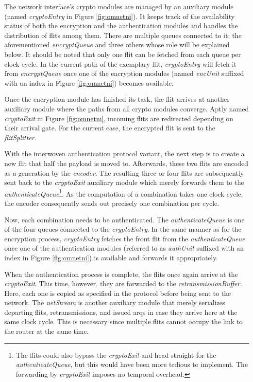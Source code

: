The network interface's crypto modules are managed by an auxiliary module (named \textit{cryptoEntry} in Figure \ref{fig:omnetni}). It keeps track of
the availability status of both the encryption and the authentication modules and handles the distribution of flits among them. There are multiple
queues connected to it; the aforementioned \textit{encryptQueue} and three others whose role will be explained below. It should be noted that only one
flit can be fetched from each queue per clock cycle. In the current path of the exemplary flit, \textit{cryptoEntry} will fetch it from
\textit{encryptQueue} once one of the encryption modules (named \textit{encUnit} suffixed with an index in Figure \ref{fig:omnetni}) becomes
available.

Once the encryption module has finished its task, the flit arrives at another auxiliary module where the paths from all crypto modules converge.
Aptly named \textit{cryptoExit} in Figure \ref{fig:omnetni}, incoming flits are redirected depending on their arrival gate. For the current case, the
encrypted flit is sent to the \textit{flitSplitter}.

With the interwoven authentication protocol variant, the next step is to create a new flit that half the payload is moved to. Afterwards, these two
flits are encoded as a generation by the \textit{encoder}. The resulting three or four flits are subsequently sent back to the \textit{cryptoExit}
auxiliary module which merely forwards them to the \textit{authenticateQueue}\footnote{The flits could also bypass the \textit{cryptoExit} and head
straight for the \textit{authenticateQueue}, but this would have been more tedious to implement. The forwarding by \textit{cryptoExit} imposes no
temporal overhead.}. As the computation of a combination takes one clock cycle, the encoder
consequently sends out precisely one combination per cycle.

Now, each combination needs to be authenticated. The \textit{authenticateQueue} is one of the four queues connected to the \textit{cryptoEntry}. In
the same manner as for the encryption process, \textit{cryptoEntry} fetches the front flit from the \textit{authenticateQueue} once one of the
authentication modules (referred to as \textit{authUnit} suffixed with an index in Figure \ref{fig:omnetni}) is available and forwards it
appropriately.

When the authentication process is complete, the flits once again arrive at the \textit{cryptoExit}. This time, however, they are forwarded to the
\textit{retransmissionBuffer}. Here, each one is copied as specified in the protocol before being sent to the network. The \textit{netStream} is
another auxiliary module that merely serializes departing flits, retransmissions, and issued \glspl{arq} in case they arrive here at the same clock
cycle. This is necessary since multiple flits cannot occupy the link to the router at the same time.

